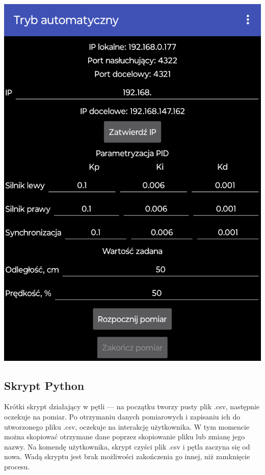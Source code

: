 \begin{center}
  \includegraphics[scale=0.3]{images/AndroidApp.png}
  \label{fig:aplikacja}
\end{center}

\subsection*{Skrypt Python}
Krótki skrypt działający w pętli --- na początku tworzy pusty plik .csv, następnie oczekuje na pomiar. Po otrzymaniu danych pomiarowych i zapisaniu ich do utworzonego pliku .csv, oczekuje na interakcję użytkownika. W tym momencie można skopiować otrzymane dane poprzez skopiowanie pliku lub zmianę jego nazwy. Na komendę użytkownika, skrypt czyści plik .csv i pętla zaczyna się od nowa. Wadą skryptu jest brak możliwości zakończenia go innej, niż zamknięcie procesu.

